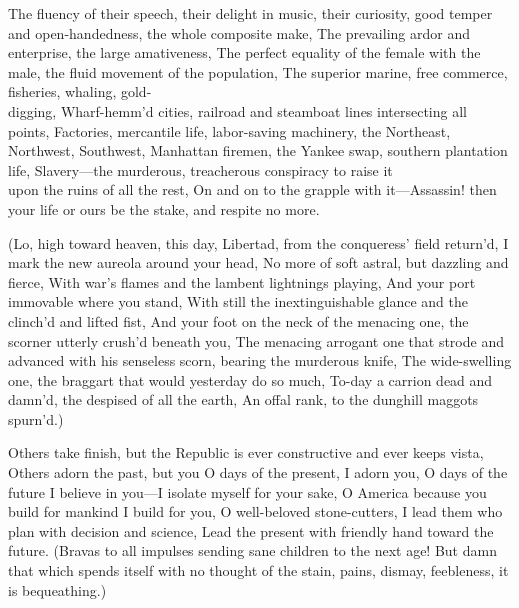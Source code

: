 \documentclass[11pt]{book}
\newenvironment {poem} [1]
 {\titulus{#1}%
  \versus
  \Nstanza{0}%
  \numerus{1}}
 {\endversus}
\begin{document}
\begin{poem}{By Blue Ontario's Shore}
The fluency of their speech, their delight in music, their cu\-ri\-os\-i\-ty, %
    good temper and open-handedness, the whole composite make,
The prevailing ardor and enterprise, the large amativeness,
The perfect equality of the female with the male, the fluid movement %
    of the population,
The superior marine, free commerce, fisheries, whaling, gold-\\digging,
Wharf-hemm'd cities, railroad and steamboat lines intersecting all points,
Factories, mercantile life, labor-saving machinery, the Northeast, %
    Northwest, Southwest,
Manhattan firemen, the Yankee swap, southern plantation life,
Slavery---the murderous, treacherous conspiracy to raise it\\ upon the %
    ruins of all the rest,
On and on to the grapple with it---Assassin! then your life or ours %
    be the stake, and respite no more.

\stropha %

(Lo, high toward heaven, this day,
Libertad, from the conqueress' field return'd,
I mark the new aureola around your head,
No more of soft astral, but dazzling and fierce,
With war's flames and the lambent lightnings playing,
And your port immovable where you stand,
With still the inextinguishable glance and the clinch'd and lifted fist,
And your foot on the neck of the menacing one, the scorner utterly %
    crush'd beneath you,
The menacing arrogant one that strode and advanced with his %
    senseless scorn, bearing the murderous knife,
The wide-swelling one, the braggart that would yesterday do so much,
To-day a carrion dead and damn'd, the despised of all the earth,
An offal rank, to the dunghill maggots spurn'd.)

\stropha %

Others take finish, but the Republic is ever constructive and ever %
    keeps vista,
Others adorn the past, but you O days of the present, I adorn you,
O days of the future I believe in you---I isolate myself for your sake,
O America because you build for mankind I build for you,
O well-beloved stone-cutters, I lead them who plan with decision %
    and science,
Lead the present with friendly hand toward the future.
(Bravas to all impulses sending sane children to the next age!
But damn that which spends itself with no thought of the stain, %
    pains, dismay, feebleness, it is bequeathing.)

\stropha %


\end{poem}
\end{document}
